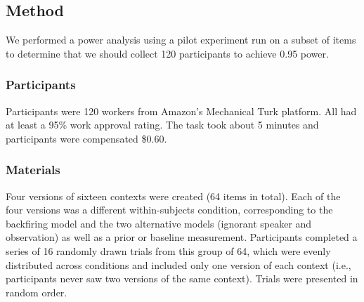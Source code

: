 \documentclass[10pt,letterpaper]{article}
\begin{document}


\subsection{Method}

We performed a power analysis using a pilot experiment run on a subset of items to determine that we should collect 120 participants to achieve 0.95 power. 

\subsubsection{Participants}

Participants were 120 workers from Amazon's Mechanical Turk platform. 
All had at least a 95\% work approval rating.
The task took about 5 minutes and participants were compensated \$0.60.

\subsubsection{Materials}

Four versions of sixteen contexts were created (64 items in total). 
Each of the four versions was a different within-subjects condition, corresponding to the backfiring model and the two alternative models (ignorant speaker and observation) as well as a prior or baseline measurement. 
Participants completed a series of 16 randomly drawn trials from this group of 64, which were evenly distributed across conditions and included only one version of each context (i.e., participants never saw two versions of the same context).  
Trials were presented in random order.
\end{document}
